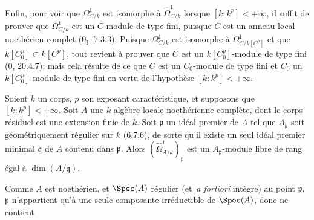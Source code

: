 Enfin, pour voir que $\Omega^1_{C/k}$ est isomorphe à $\hat{\Omega}^1_{C/k}$ lorsque $[k:k^p]<+\infty$, il suffit de prouver que $\Omega^1_{C/k}$ est un $C$-module de type fini, puisque $C$ est un anneau local noethérien complet ($0_{\mathrm I}$, 7.3.3). Puisque $\Omega^1_{C/k}$ est isomorphe à $\Omega^1_{C/k[C^p]}$ et que $k[C_0^p]\subset k[C^p]$, tout revient à prouver que $C$ est un $k[C_0^p]$-module de type fini (0, 20.4.7); mais cela résulte de ce que $C$ est un $C_0$-module de type fini et $C_0$ un $k[C_0^p]$-module de type fini en vertu de l'hypothèse $[k:k^p]<+\infty$.

\begin{lemma}[18.11.3]
\label{IV.18.11.3}
Soient $k$ un corps, $p$ son exposant caractéristique, et supposons que $[k:k^p]<+\infty$. Soit $A$ une $k$-algèbre locale noethérienne complète, dont le corps résiduel est une extension finie de $k$. Soit $\mathfrak p$ un idéal premier de $A$ tel que $A_{\mathfrak p}$ soit géométriquement régulier sur $k$ (6.7.6), de sorte qu'il existe un seul idéal premier minimal $\mathfrak q$ de $A$ contenu dans $\mathfrak p$. Alors $(\hat{\Omega}^1_{A/k})_{\mathfrak p}$ est un $A_{\mathfrak p}$-module libre de rang égal à $\dim(A/\mathfrak q)$.
\end{lemma}

Comme $A$ est noethérien, et $\Spec(A)$ régulier (et \,\emph{a fortiori} intègre) au point $\mathfrak p$, $\mathfrak p$ n'appartient qu'à une seule composante irréductible de $\Spec(A)$, donc ne contient


